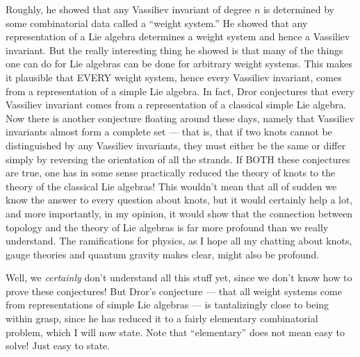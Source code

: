 \documentclass{article}
\begin{document}
Roughly, he showed that any Vassiliev invariant of degree \(n\) is
determined by some combinatorial data called a ``weight system.'' He
showed that any representation of a Lie algebra determines a weight
system and hence a Vassiliev invariant. But the really interesting thing
he showed is that many of the things one can do for Lie algebras can be
done for arbitrary weight systems. This makes it plausible that EVERY
weight system, hence every Vassiliev invariant, comes from a
representation of a simple Lie algebra. In fact, Dror conjectures that
every Vassiliev invariant comes from a representation of a classical
simple Lie algebra. Now there is another conjecture floating around
these days, namely that Vassiliev invariants almost form a complete set
--- that is, that if two knots cannot be distinguished by any Vassiliev
invariants, they must either be the same or differ simply by reversing
the orientation of all the strands. If BOTH these conjectures are true,
one has in some sense practically reduced the theory of knots to the
theory of the classical Lie algebras! This wouldn't mean that all of
sudden we know the answer to every question about knots, but it would
certainly help a lot, and more importantly, in my opinion, it would show
that the connection between topology and the theory of Lie algebras is
far more profound than we really understand. The ramifications for
physics, as I hope all my chatting about knots, gauge theories and
quantum gravity makes clear, might also be profound.

Well, we \emph{certainly} don't understand all this stuff yet, since we
don't know how to prove these conjectures! But Dror's conjecture ---
that all weight systems come from representations of simple Lie algebras
--- is tantalizingly close to being within grasp, since he has reduced
it to a fairly elementary combinatorial problem, which I will now state.
Note that ``elementary'' does not mean easy to solve! Just easy to
state.
\end{document}
